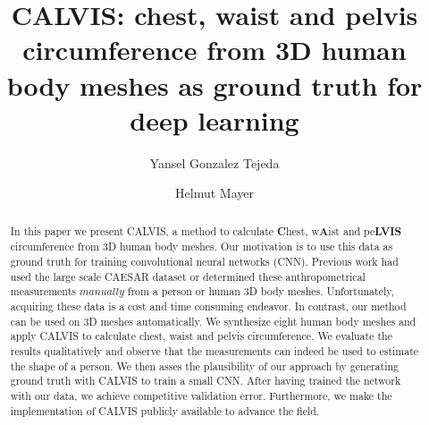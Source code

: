 \documentclass[runningheads, orivec]{llncs}
\begin{document}
%
\title{CALVIS: chest, waist and pelvis circumference from 3D human body meshes	
as ground truth for deep learning}
%
%
\author{Yansel Gonzalez Tejeda \and
Helmut Mayer}
%
%
%
\maketitle              %
%
\begin{abstract}
In this paper we present CALVIS, a method to calculate \textbf{C}hest, 
w\textbf{A}ist and pe\textbf{LVIS} circumference from 3D human body meshes. Our 
motivation is to use 
this data as ground truth for training convolutional neural networks 
(CNN). Previous work had used the large scale CAESAR dataset or determined 
these anthropometrical measurements $\textit{manually}$ from a person 
or human 3D body meshes. 
Unfortunately, acquiring these data is a cost and 
time consuming endeavor. In contrast, our method can be used on 
3D meshes automatically. We synthesize eight human body meshes and 
apply 
CALVIS to calculate chest, waist and pelvis circumference. We evaluate the 
results qualitatively and observe that the measurements can indeed be used 
to estimate the shape of a person. We then asses the 
plausibility of our approach by generating
ground truth with CALVIS to train a small CNN. After
having trained the network with 
our data, we achieve competitive validation error.
Furthermore, we make the implementation of CALVIS publicly available to 
advance the field.

\end{abstract}
%
%
%
\end{document}
